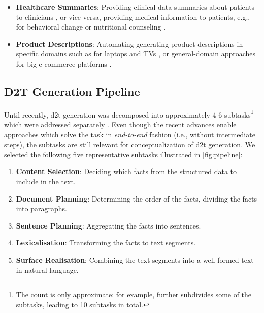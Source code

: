 {\begin{itemize}
    \item \textbf{Healthcare Summaries}: Providing clinical data summaries about patients to clinicians \cite{portet2009automatic,scott2013data}, or vice versa, providing medical information to patients, e.g., for behavioral change \cite{reiter2003lessons} or nutritional counseling \cite{balloccu-reiter-2022-comparing}.
    \item \textbf{Product Descriptions}: Automating generating product descriptions in specific domains such as for laptops and TVs \cite{wen2015toward,wen2016multi}, or general-domain approaches for big e-commerce platforms \cite{shaoControllableDiverseText2021,kotoCanPretrainedLanguage2022}.
\end{itemize}

\subsection{D2T Generation Pipeline}
\label{sec:d2t-pipeline}


Until recently, \ac{d2t} generation was decomposed into approximately 4-6 subtasks\footnote{The count is only approximate: for example, \citet{milleModD2TMultilayerDataset2023} further subdivides some of the subtasks, leading to 10 subtasks in total.} which were addressed separately \cite{reiterBuildingAppliedNatural1997,reiterArchitectureDatatoTextSystems2007,gattSurveyStateArt2018}. Even though the recent advances enable approaches which solve the task in \emph{end-to-end} fashion (i.e., without intermediate steps), the subtasks are still relevant for conceptualization of \ac{d2t} generation. We selected the following five representative subtasks illustrated in \autoref{fig:pipeline}:

\begin{enumerate}
    \item \textbf{Content Selection}: Deciding which facts from the structured data
          to include in the text.
    \item \textbf{Document Planning}: Determining the order of the
          facts, dividing the facts into paragraphs.
    \item \textbf{Sentence Planning}: Aggregating the facts into
          sentences.
    \item \textbf{Lexicalisation}: Transforming the facts to text segments.
    \item \textbf{Surface Realisation}: Combining the text segments into a well-formed text in natural language.
\end{enumerate}


}

